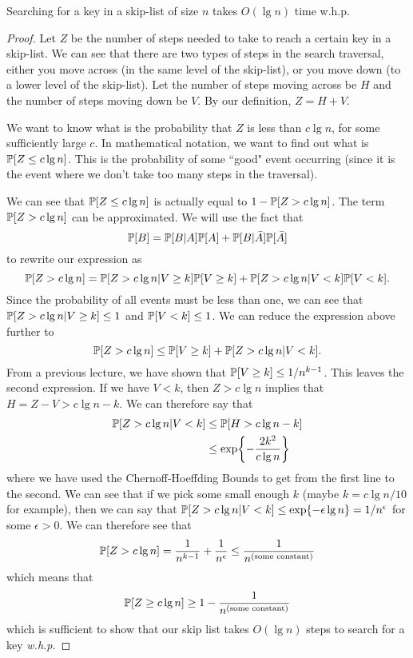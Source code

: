 \documentclass[12pt]{article}
\begin{document}
\begin{lemma} Searching for a key in a skip-list of size $n$ takes $O(\lg n)$ time w.h.p. 
\end{lemma}
\begin{proof} 
	Let $Z$ be the number of steps needed to take to reach a certain key in a skip-list. We can see that there are two types of steps in the search traversal, either you move across (in the same level of the skip-list), or you move down (to a lower level of the skip-list). Let the number of steps moving across be $H$ and the number of steps moving down be $V$. By our definition, $Z = H + V$. 
	
	We want to know what is the probability that $Z$ is less than $c \lg n$, for some sufficiently large $c$. In mathematical notation, we want to find out what is $\mathbb{P}[Z \leq c \lg n]$. This is the probability of some ``good" event occurring (since it is the event where we don't take too many steps in the traversal). 
	
	We can see that $\mathbb{P}[Z \leq c \lg n]$ is actually equal to $1 - \mathbb{P}[Z > c \lg n]$. The term $\mathbb{P}[Z > c \lg n]$ can be approximated. We will use the fact that $$\mathbb{P}[B] = \mathbb{P}[B|A]\mathbb{P}[A] + \mathbb{P}[B|\bar{A}]\mathbb{P}[\bar{A}]$$ to rewrite our expression as
	$$\mathbb{P}[Z > c \lg n] = \mathbb{P}[Z > c \lg n | V \geq k] \mathbb{P}[V\geq k] + \mathbb{P}[Z > c \lg n | V < k] \mathbb{P}[V< k].$$
	Since the probability of all events must be less than one, we can see that $\mathbb{P}[Z > c \lg n | V \geq k] \leq 1$ and $\mathbb{P}[V< k] \leq 1$. We can reduce the expression above further to
	$$\mathbb{P}[Z > c \lg n] \leq \mathbb{P}[V\geq k] + \mathbb{P}[Z > c \lg n | V < k].$$
	From a previous lecture, we have shown that $\mathbb{P}[V\geq k] \leq 1/n^{k-1}$. This leaves the second expression. If we have $V < k$, then $Z > c\lg n$ implies that $H = Z - V > c\lg n - k$. We can therefore say that
	\begin{align*}
		\mathbb{P}[Z > c \lg n | V < k] &\leq \mathbb{P}[H > c\lg n - k] \\
		&\leq \exp \biggl\{ -\frac{2k^2}{c\lg n} \biggr\}
	\end{align*}
	where we have used the Chernoff-Hoeffding Bounds to get from the first line to the second. 
	We can see that if we pick some small enough $k$ (maybe $k = c \lg n/10$ for example), then we can say that $\mathbb{P}[Z > c \lg n | V < k] \leq \exp\{-\epsilon \lg n\} = 1/n^\epsilon$ for some $\epsilon > 0$. We can therefore see that
	$$\mathbb{P}[Z > c \lg n] = \frac{1}{n^{k-1}} + \frac{1}{n^\epsilon} \leq \frac{1}{n^{(\textmd{some constant})}}$$
	which means that
	$$\mathbb{P}[Z \geq c \lg n]  \geq 1 - \frac{1}{n^{(\textmd{some constant})}}$$
	which is sufficient to show that our skip list takes $O(\lg n)$ steps to search for a key \textit{w.h.p.}
\end{proof}
\end{document}
